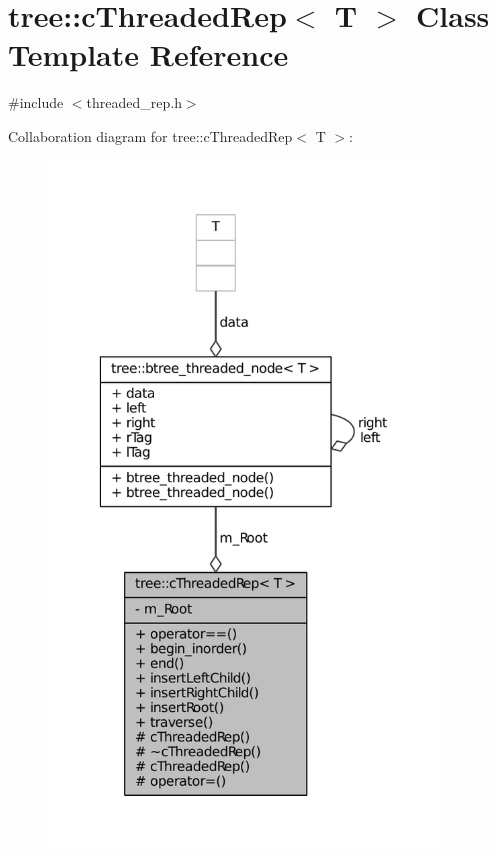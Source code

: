 \hypertarget{classtree_1_1cThreadedRep}{\section{tree\-:\-:c\-Threaded\-Rep$<$ \-T $>$ \-Class \-Template \-Reference}
\label{classtree_1_1cThreadedRep}
}


{\ttfamily \#include $<$threaded\-\_\-rep.\-h$>$}



\-Collaboration diagram for tree\-:\-:c\-Threaded\-Rep$<$ \-T $>$\-:
\nopagebreak
\begin{figure}[H]
\begin{center}
\leavevmode
\includegraphics[width=295pt]{classtree_1_1cThreadedRep__coll__graph}
\end{center}
\end{figure}
